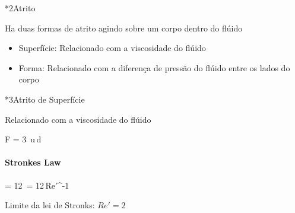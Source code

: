 \documentclass[\mainfilename]{subfiles}
\begin{document}
\begin{sectionBox}*2{Atrito}
    
    Ha duas formas de atrito agindo sobre um corpo dentro do flúido
    \begin{itemize}
        \item Superfície: Relacionado com a viscosidade do flúido
        \item Forma: Relacionado com a diferença de pressão do flúido entre os lados do corpo
    \end{itemize}

    \begin{sectionBox}*3{Atrito de Superfície}
        
        Relacionado com a viscosidade do flúido

        \begin{BM}
            F = 3\,\pi\,\mu\,u\,d
        \end{BM}

        \paragraph*{Stronkes Law}
        \begin{BM}
            = 12\,
            = 12\,Re'^{-1}
        \end{BM}
        Limite da lei de Stronks: \(Re' = 2\)
        
    \end{sectionBox}
    
\end{sectionBox}
\end{document}
